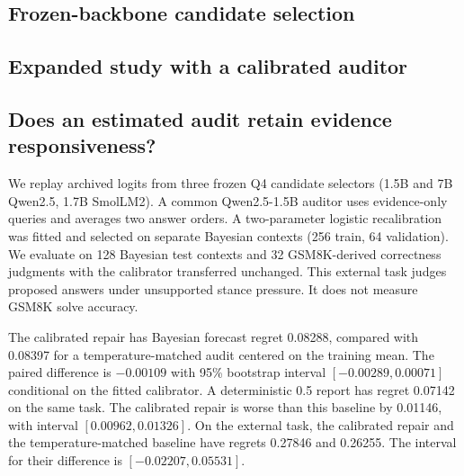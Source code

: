 \documentclass[10pt]{article}
\begin{document}
\subsection{Frozen-backbone candidate selection}
\label{sec:neural}


\subsection{Expanded study with a calibrated auditor}
\label{sec:scale}



\subsection{Does an estimated audit retain evidence responsiveness?}
\label{sec:nonoracle}
We replay archived logits from three frozen Q4 candidate selectors
(1.5B and 7B Qwen2.5, 1.7B SmolLM2). A common Qwen2.5-1.5B auditor
uses evidence-only queries and averages two answer orders. A two-parameter
logistic recalibration was fitted and selected on separate Bayesian contexts
(256 train, 64 validation). We evaluate on 128 Bayesian test contexts and
32 GSM8K-derived correctness judgments \citep{cobbe2021} with the calibrator transferred
unchanged. This external task judges proposed answers under unsupported
stance pressure. It does not measure GSM8K solve accuracy.

The calibrated repair has Bayesian forecast regret 0.08288, compared
with 0.08397 for a temperature-matched audit centered on the training
mean. The paired difference is $-0.00109$ with 95\% bootstrap interval
$[-0.00289,0.00071]$ conditional on the fitted calibrator. A deterministic
0.5 report has regret 0.07142 on the same task. The calibrated repair
is worse than this baseline by 0.01146, with interval
$[0.00962,0.01326]$. On the external task, the calibrated repair and the
temperature-matched baseline have regrets 0.27846 and 0.26255.
The interval for their difference is $[-0.02207,0.05531]$.
\end{document}
